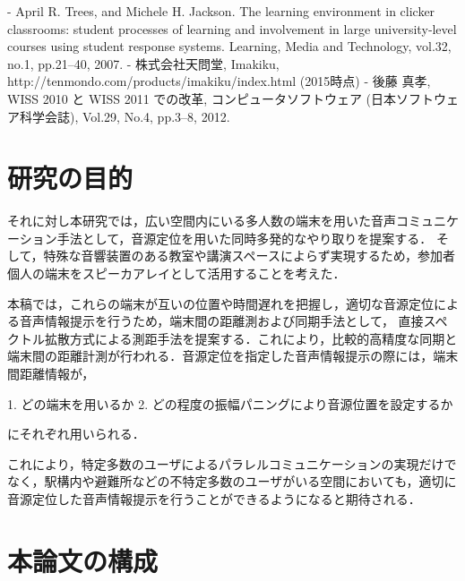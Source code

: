 - April R. Trees, and Michele H. Jackson. The learning environment in clicker classrooms: student processes of learning and involvement in large university‐level courses using student response systems. Learning, Media and Technology, vol.32, no.1, pp.21--40, 2007.
- 株式会社天問堂, Imakiku, http://tenmondo.com/products/imakiku/index.html (2015時点)
- 後藤 真孝, WISS 2010 と WISS 2011 での改革, コンピュータソフトウェア (日本ソフトウェア科学会誌), Vol.29, No.4, pp.3--8, 2012.


\section{研究の目的}

それに対し本研究では，広い空間内にいる多人数の端末を用いた音声コミュニケーション手法として，音源定位を用いた同時多発的なやり取りを提案する．
そして，特殊な音響装置のある教室や講演スペースによらず実現するため，参加者個人の端末をスピーカアレイとして活用することを考えた．


本稿では，これらの端末が互いの位置や時間遅れを把握し，適切な音源定位による音声情報提示を行うため，端末間の距離測および同期手法として，
直接スペクトル拡散方式による測距手法を提案する．これにより，比較的高精度な同期と端末間の距離計測が行われる．音源定位を指定した音声情報提示の際には，端末間距離情報が，

1. どの端末を用いるか
2. どの程度の振幅パニングにより音源位置を設定するか

にそれぞれ用いられる．

これにより，特定多数のユーザによるパラレルコミュニケーションの実現だけでなく，駅構内や避難所などの不特定多数のユーザがいる空間においても，適切に音源定位した音声情報提示を行うことができるようになると期待される．



\clearpage

\section{本論文の構成}
